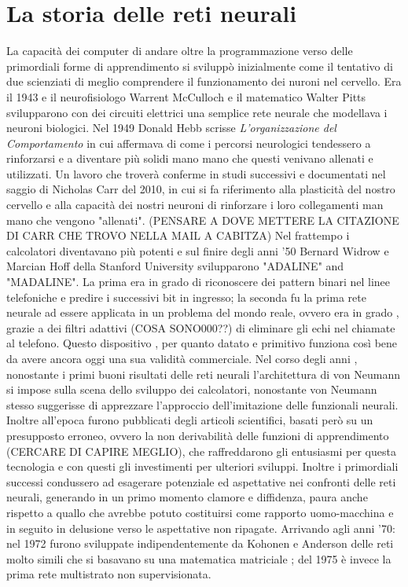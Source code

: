 \section*{La storia delle reti neurali}
La capacità dei computer di andare oltre la programmazione verso delle primordiali forme di apprendimento si sviluppò inizialmente come il tentativo di due scienziati di meglio comprendere il funzionamento dei nuroni nel cervello.
Era il 1943 e il neurofisiologo Warrent McCulloch e il matematico Walter Pitts svilupparono con dei circuiti elettrici una semplice rete neurale che modellava i neuroni biologici.
Nel 1949 Donald Hebb scrisse \textit{L'organizzazione del Comportamento} in cui affermava di come i percorsi neurologici tendessero a rinforzarsi e a diventare più solidi mano mano che questi venivano allenati e utilizzati. Un lavoro che troverà conferme in studi successivi e documentati nel saggio di Nicholas Carr del 2010, in cui si fa riferimento alla plasticità del nostro cervello e alla capacità dei nostri neuroni di rinforzare i loro collegamenti man mano che vengono "allenati".
(PENSARE A DOVE METTERE LA CITAZIONE DI CARR CHE TROVO NELLA MAIL A CABITZA)
Nel frattempo i calcolatori diventavano più potenti e sul finire degli anni '50 Bernard Widrow e Marcian Hoff della Stanford University svilupparono "ADALINE" and "MADALINE". La prima era in grado di riconoscere dei pattern binari nel linee telefoniche e predire i successivi bit in ingresso; la seconda fu la prima rete neurale ad essere applicata in un problema del mondo reale, ovvero era in grado , grazie a dei filtri adattivi (COSA SONO000??) di eliminare gli echi nel chiamate al telefono. Questo dispositivo , per quanto datato e primitivo funziona così bene da avere ancora oggi una sua validità commerciale.
Nel corso degli anni , nonostante i primi buoni risultati delle reti neurali l'architettura di von Neumann si impose sulla scena dello sviluppo dei calcolatori, nonostante von Neumann stesso suggerisse di apprezzare l'approccio dell'imitazione delle funzionali neurali.
Inoltre all'epoca furono pubblicati degli articoli scientifici, basati però su un presupposto erroneo, ovvero la non derivabilità delle funzioni di apprendimento (CERCARE DI CAPIRE MEGLIO), che raffreddarono gli entusiasmi per questa tecnologia e con questi gli investimenti per ulteriori sviluppi. Inoltre i primordiali successi condussero ad esagerare potenziale ed aspettative nei confronti delle reti neurali, generando in un primo momento clamore e diffidenza, paura anche rispetto a quallo che avrebbe potuto costituirsi come rapporto uomo-macchina e in seguito in delusione verso le aspettative non ripagate. 
Arrivando agli anni '70: nel 1972 furono sviluppate indipendentemente da Kohonen e Anderson delle reti molto simili che si basavano su una matematica matriciale ; del 1975 è invece la prima rete multistrato non supervisionata.

